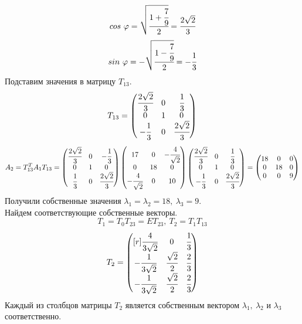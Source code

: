 \documentclass[12pt]{article}
\theoremstyle{definition}
\numberwithin{equation}{section}
\begin{document}
$$cos ~\varphi=\sqrt{\cfrac{1+\cfrac{7}{9}}{2}}=\cfrac{2\sqrt{2}}{3}$$
$$sin ~\varphi=-\sqrt{\cfrac{1-\cfrac{7}{9}}{2}}=-\cfrac{1}{3}$$
Подставим значения в матрицу $T_{13}$.
\[T_{13} = \begin{pmatrix}
\cfrac{2\sqrt{2}}{3} & 0 & \cfrac{1}{3}\\
0 & 1 & 0\\
-\cfrac{1}{3} & 0 & \cfrac{2\sqrt{2}}{3}\\
\end{pmatrix}\]
\[A_2= T_{13}^T A_1 T_{13}=\begin{pmatrix}
\cfrac{2\sqrt{2}}{3} & 0 & -\cfrac{1}{3}\\
0 & 1 & 0\\
\cfrac{1}{3} & 0 & \cfrac{2\sqrt{2}}{3}\\
\end{pmatrix} \begin{pmatrix}
17 & 0 & -\cfrac{4}{\sqrt{2}}\\
0 & 18 & 0\\
-\cfrac{4}{\sqrt{2}} & 0 & 10\\
\end{pmatrix} \begin{pmatrix}
\cfrac{2\sqrt{2}}{3} & 0 & \cfrac{1}{3}\\
0 & 1 & 0\\
-\cfrac{1}{3} & 0 & \cfrac{2\sqrt{2}}{3}\\
\end{pmatrix}=\begin{pmatrix}
18 & 0 & 0\\
0 & 18 & 0\\
0 & 0 & 9\\
\end{pmatrix}\]
Получили собственные значения $\lambda_1=\lambda_2=18,~\lambda_3=9$.\\
Найдем соответствующие собственные векторы.
$$T_1=T_0T_{23}=ET_{23},~T_2=T_1T_{13}$$
\[T_2 = \begin{pmatrix}[r]
\cfrac{4}{3\sqrt{2}} & 0 & \cfrac{1}{3}\\
-\cfrac{1}{3\sqrt{2}} & \cfrac{\sqrt{2}}{2} & \cfrac{2}{3}\\
-\cfrac{1}{3\sqrt{2}} & \cfrac{\sqrt{2}}{2} & \cfrac{2}{3}\\
\end{pmatrix}\]
Каждый из столбцов матрицы $T_2$ является собственным вектором $\lambda_1,~\lambda_2$ и $\lambda_3$ соответственно.\\ \\
\end{document}
